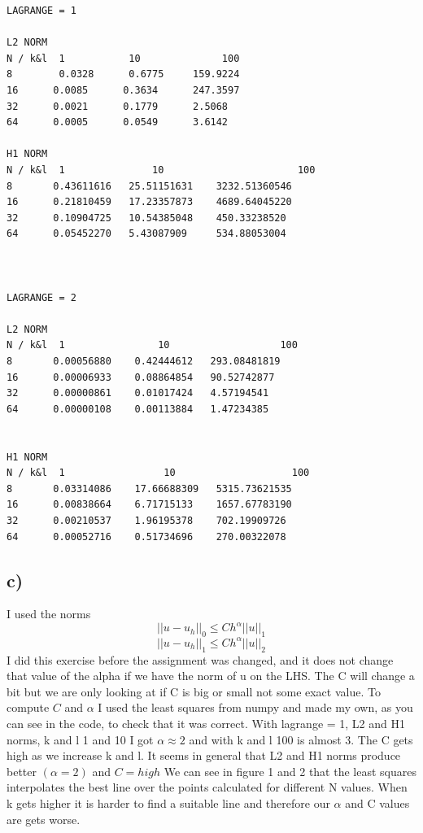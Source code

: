 \documentclass[a4paper,norsk]{article}
\begin{document}
\begin{lstlisting}
LAGRANGE = 1

L2 NORM
N / k&l  1           10              100
8        0.0328      0.6775     159.9224
16      0.0085      0.3634      247.3597
32      0.0021      0.1779      2.5068
64      0.0005      0.0549      3.6142

H1 NORM
N / k&l  1               10                       100
8       0.43611616   25.51151631    3232.51360546
16      0.21810459   17.23357873    4689.64045220
32      0.10904725   10.54385048    450.33238520
64      0.05452270   5.43087909     534.88053004



LAGRANGE = 2

L2 NORM
N / k&l  1                10                   100
8       0.00056880    0.42444612   293.08481819
16      0.00006933    0.08864854   90.52742877
32      0.00000861    0.01017424   4.57194541
64      0.00000108    0.00113884   1.47234385


H1 NORM
N / k&l  1                 10                    100
8       0.03314086    17.66688309   5315.73621535
16      0.00838664    6.71715133    1657.67783190
32      0.00210537    1.96195378    702.19909726
64      0.00052716    0.51734696    270.00322078
\end{lstlisting}


\subsection*{c)}
I used the norms  
 $$ \vert \vert u-u_h \vert \vert_{0} \leq C h^\alpha \vert \vert u \vert \vert_{1} $$
 $$ \vert \vert u-u_h \vert \vert_{1} \leq C h^\alpha \vert \vert u \vert \vert_{2} $$
I did this exercise before the assignment was changed, and it does not change that value of the alpha if we have the norm of u on the LHS. The C will change a bit but we are only looking at if C is big or small not some exact value. \newline
To compute $C$ and $\alpha$ I used the least squares from numpy and made my own, as you can see in the code, to check that it was correct. With lagrange = 1,  L2 and H1 norms, k and l 1 and 10 I got  $\alpha \approx 2$ and with k and l 100 is almost 3. The C gets high as we increase k and l.  \newline
It seems in general that L2 and H1 norms produce better $(\alpha=2)$ and $C = high$ \newline
We can see in figure 1 and 2 that the least squares interpolates the best line over the points calculated for different N values. When k gets higher it is harder to find a suitable line and therefore our $\alpha$ and C values are gets worse. 
\end{document}

